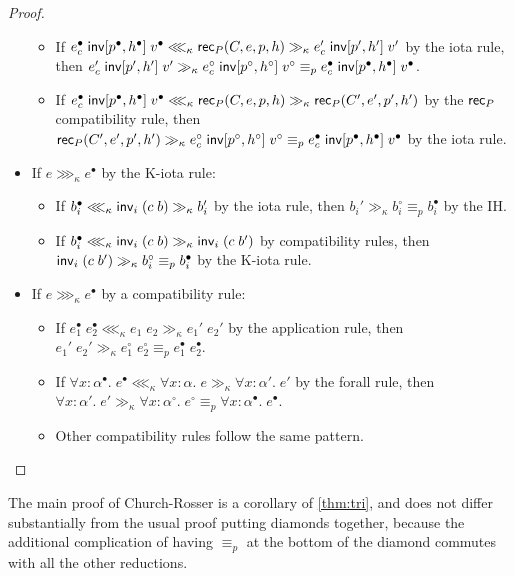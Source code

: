 \begin{proof}
\begin{itemize}
\begin{itemize}
\item If $e_c^\bullet\;\mathsf{inv}[p^\bullet,h^\bullet]\;v^\bullet\lll_\kappa \mathsf{rec}_P(C,e,p,h)\gg_\kappa e_c'\;\mathsf{inv}[p',h']\;v'$ by the iota rule, then $e_c'\;\mathsf{inv}[p',h']\;v'\gg_\kappa e_c^\circ\;\mathsf{inv}[p^\circ,h^\circ]\;v^\circ\equiv_p e_c^\bullet\;\mathsf{inv}[p^\bullet,h^\bullet]\;v^\bullet$.
\item If $e_c^\bullet\;\mathsf{inv}[p^\bullet,h^\bullet]\;v^\bullet\lll_\kappa \mathsf{rec}_P(C,e,p,h)\gg_\kappa \mathsf{rec}_P(C',e',p',h')$ by the $\mathsf{rec}_P$ compatibility rule, then $\mathsf{rec}_P(C',e',p',h')\gg_\kappa e_c^\circ\;\mathsf{inv}[p^\circ,h^\circ]\;v^\circ\equiv_p e_c^\bullet\;\mathsf{inv}[p^\bullet,h^\bullet]\;v^\bullet$ by the iota rule.
\end{itemize}
\item If $e\ggg_\kappa e^\bullet$ by the K-iota rule:
\begin{itemize}
\item If $b_i^\bullet\lll_\kappa \mathsf{inv}_i\;(c\;b)\gg_\kappa b_i'$ by the iota rule, then $b_i'\gg_\kappa b_i^\circ\equiv_p b_i^\bullet$ by the IH.
\item If $b_i^\bullet\lll_\kappa \mathsf{inv}_i\;(c\;b)\gg_\kappa \mathsf{inv}_i\;(c\;b')$ by compatibility rules, then $\mathsf{inv}_i\;(c\;b')\gg_\kappa b_i^\circ\equiv_p b_i^\bullet$ by the K-iota rule.
\end{itemize}
\item If $e\ggg_\kappa e^\bullet$ by a compatibility rule:
\begin{itemize}
\item If $e_1^\bullet\;e_2^\bullet\lll_\kappa e_1\;e_2\gg_\kappa e_1'\;e_2'$ by the application rule, then $e_1'\;e_2'\gg_\kappa e_1^\circ\;e_2^\circ\equiv_p e_1^\bullet\;e_2^\bullet$.
\item If $\forall x:\alpha^\bullet.\;e^\bullet\lll_\kappa \forall x:\alpha.\;e\gg_\kappa \forall x:\alpha'.\;e'$ by the forall rule, then $\forall x:\alpha'.\;e'\gg_\kappa \forall x:\alpha^\circ.\;e^\circ\equiv_p \forall x:\alpha^\bullet.\;e^\bullet$.
\item Other compatibility rules follow the same pattern.
\end{itemize}
\end{itemize}
\end{proof}
The main proof of Church-Rosser is a corollary of \autoref{thm:tri}, and does not differ substantially from the usual proof putting diamonds together, because the additional complication of having $\equiv_p$ at the bottom of the diamond commutes with all the other reductions.
